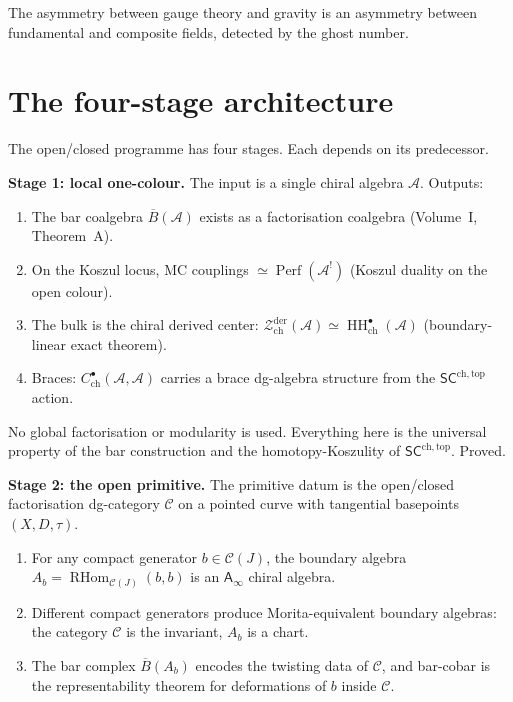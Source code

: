 \documentclass[11pt]{article}
\newcommand{\cA}{\mathcal{A}}
\newcommand{\cC}{\mathcal{C}}
\newcommand{\cZ}{\mathcal{Z}}
\newcommand{\barB}{\overline{B}}
\newcommand{\Ainf}{\mathsf{A}_{\infty}}
\newcommand{\SCchtop}{\mathsf{SC}^{\mathrm{ch,top}}}
\newcommand{\RHom}{\operatorname{RHom}}
\newcommand{\HH}{\operatorname{HH}}
\newcommand{\Perf}{\operatorname{Perf}}
\newcommand{\Zder}{\cZ^{\mathrm{der}}_{\mathrm{ch}}}
\begin{document}
The asymmetry between gauge theory and gravity is an asymmetry
between fundamental and composite fields, detected by the ghost
number.


\section{The four-stage architecture}
\label{sec:four-stages}

The open/closed programme has four stages.  Each depends on its
predecessor.

\medskip

\noindent
\textbf{Stage 1: local one-colour.}
The input is a single chiral algebra $\cA$.  Outputs:

\begin{enumerate}[label=\textup{(\alph*)},nosep]
\item The bar coalgebra $\barB(\cA)$ exists as a factorisation
  coalgebra (Volume~I, Theorem~A).
\item On the Koszul locus, MC couplings
  $\simeq \Perf(\cA^!)$ (Koszul duality on the open colour).
\item The bulk is the chiral derived center:
  $\Zder(\cA) \simeq \HH^\bullet_{\mathrm{ch}}(\cA)$
  (boundary-linear exact theorem).
\item Braces: $C^\bullet_{\mathrm{ch}}(\cA, \cA)$ carries a brace
  dg-algebra structure from the $\SCchtop$ action.
\end{enumerate}

No global factorisation or modularity is used.  Everything here
is the universal property of the bar construction and the
homotopy-Koszulity of $\SCchtop$.  Proved.

\medskip

\noindent
\textbf{Stage 2: the open primitive.}
The primitive datum is the open/closed factorisation dg-category
$\cC$ on a pointed curve with tangential basepoints
$(X, D, \tau)$.

\begin{enumerate}[label=\textup{(\alph*)},nosep]
\item For any compact generator $b \in \cC(J)$, the boundary
  algebra $A_b = \RHom_{\cC(J)}(b,b)$ is an $\Ainf$ chiral
  algebra.
\item Different compact generators produce Morita-equivalent
  boundary algebras: the category $\cC$ is the invariant,
  $A_b$ is a chart.
\item The bar complex $\barB(A_b)$ encodes the twisting data
  of $\cC$, and bar-cobar is the representability theorem for
  deformations of $b$ inside $\cC$.
\end{enumerate}
\end{document}
